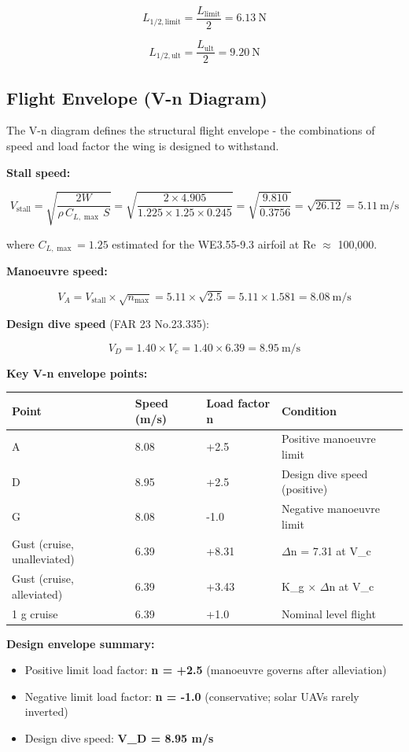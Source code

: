 \documentclass[10pt,a4paper]{article}
\begin{document}
\[
L_{1/2,\text{limit}} = \frac{L_{\text{limit}}}{2} = 6.13\ \text{N}
\]

\[
L_{1/2,\text{ult}} = \frac{L_{\text{ult}}}{2} = 9.20\ \text{N}
\]


\subsection{Flight Envelope (V-n Diagram)}


The V-n diagram defines the structural flight envelope - the combinations of speed and load factor the wing is designed to withstand.

\textbf{Stall speed:}

\[
V_{\text{stall}} = \sqrt{\frac{2W}{\rho\,C_{L,\max}\,S}} = \sqrt{\frac{2 \times 4.905}{1.225 \times 1.25 \times 0.245}} = \sqrt{\frac{9.810}{0.3756}} = \sqrt{26.12} = 5.11\ \text{m/s}
\]

where $C_{L,\max} = 1.25$ estimated for the WE3.55-9.3 airfoil at Re ${\approx}$ 100,000.

\textbf{Manoeuvre speed:}

\[
V_A = V_{\text{stall}} \times \sqrt{n_{\text{max}}} = 5.11 \times \sqrt{2.5} = 5.11 \times 1.581 = 8.08\ \text{m/s}
\]

\textbf{Design dive speed} (FAR 23 No.23.335):

\[
V_D = 1.40 \times V_c = 1.40 \times 6.39 = 8.95\ \text{m/s}
\]

\textbf{Key V-n envelope points:}

\begin{center}
\begin{tabular}{|l|l|l|l|}
\hline
Point & Speed (m/s) & Load factor n & Condition \\
\hline
A & 8.08 & +2.5 & Positive manoeuvre limit \\
\hline
D & 8.95 & +2.5 & Design dive speed (positive) \\
\hline
G & 8.08 & -1.0 & Negative manoeuvre limit \\
\hline
Gust (cruise, unalleviated) & 6.39 & +8.31 & ${\Delta}$n = 7.31 at V\_c \\
\hline
Gust (cruise, alleviated) & 6.39 & +3.43 & K\_g ${\times}$ ${\Delta}$n at V\_c \\
\hline
1 g cruise & 6.39 & +1.0 & Nominal level flight \\
\hline
\end{tabular}
\end{center}

\textbf{Design envelope summary:}
\begin{itemize}[noitemsep,topsep=2pt]
\item Positive limit load factor: \textbf{n = +2.5} (manoeuvre governs after alleviation)
\item Negative limit load factor: \textbf{n = -1.0} (conservative; solar UAVs rarely inverted)
\item Design dive speed: \textbf{V\_D = 8.95 m/s}
\end{itemize}
\end{document}
